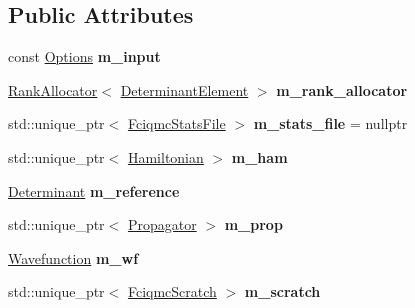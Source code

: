 \subsection*{Public Attributes}
\begin{DoxyCompactItemize}
\item 
const \hyperlink{structOptions}{Options} {\bfseries m\+\_\+input}\hypertarget{classFciqmcCalculation_a6bd0fbd0be08d02508374f210fd697e9}{}\label{classFciqmcCalculation_a6bd0fbd0be08d02508374f210fd697e9}

\item 
\hyperlink{classRankAllocator}{Rank\+Allocator}$<$ \hyperlink{classDeterminantElement}{Determinant\+Element} $>$ {\bfseries m\+\_\+rank\+\_\+allocator}\hypertarget{classFciqmcCalculation_ae436921849704c8c6e506e852cd351b4}{}\label{classFciqmcCalculation_ae436921849704c8c6e506e852cd351b4}

\item 
std\+::unique\+\_\+ptr$<$ \hyperlink{structFciqmcStatsFile}{Fciqmc\+Stats\+File} $>$ {\bfseries m\+\_\+stats\+\_\+file} = nullptr\hypertarget{classFciqmcCalculation_a8ed0b6f6ea5000b28b8b6ac9a94dc9bd}{}\label{classFciqmcCalculation_a8ed0b6f6ea5000b28b8b6ac9a94dc9bd}

\item 
std\+::unique\+\_\+ptr$<$ \hyperlink{classHamiltonian}{Hamiltonian} $>$ {\bfseries m\+\_\+ham}\hypertarget{classFciqmcCalculation_a36f70fc13cb06d9677f1fb99fd5c6fe2}{}\label{classFciqmcCalculation_a36f70fc13cb06d9677f1fb99fd5c6fe2}

\item 
\hyperlink{classDeterminant}{Determinant} {\bfseries m\+\_\+reference}\hypertarget{classFciqmcCalculation_a6d40f0135cd279b0310ffe7d61c3ddbd}{}\label{classFciqmcCalculation_a6d40f0135cd279b0310ffe7d61c3ddbd}

\item 
std\+::unique\+\_\+ptr$<$ \hyperlink{classPropagator}{Propagator} $>$ {\bfseries m\+\_\+prop}\hypertarget{classFciqmcCalculation_aed91e3c62c69624dd60d37309d6ff0f9}{}\label{classFciqmcCalculation_aed91e3c62c69624dd60d37309d6ff0f9}

\item 
\hyperlink{classWavefunction}{Wavefunction} {\bfseries m\+\_\+wf}\hypertarget{classFciqmcCalculation_ac343a139f53dbbc24384633144da4400}{}\label{classFciqmcCalculation_ac343a139f53dbbc24384633144da4400}

\item 
std\+::unique\+\_\+ptr$<$ \hyperlink{structFciqmcScratch}{Fciqmc\+Scratch} $>$ {\bfseries m\+\_\+scratch}\hypertarget{classFciqmcCalculation_a92ef80019a6e28e2d32df3c4bfa3db5d}{}\label{classFciqmcCalculation_a92ef80019a6e28e2d32df3c4bfa3db5d}

\end{DoxyCompactItemize}


